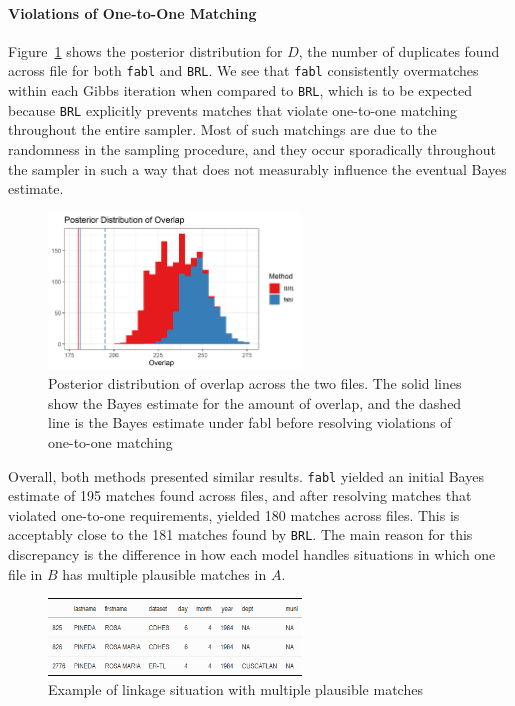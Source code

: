 \documentclass[12pt,letterpaper]{article}
\newcommand{\1}[1]{\mathbb{I}\!\left[#1\right]} %
\begin{document}
\paragraph{Violations of One-to-One Matching} Figure~\ref{fig:overlap-plot} shows the posterior distribution for \(D\), the number of
duplicates found across file for both \texttt{fabl} and \texttt{BRL}. We
see that \texttt{fabl} consistently overmatches within each Gibbs
iteration when compared to \texttt{BRL}, which is to be expected because
\texttt{BRL} explicitly prevents matches that violate one-to-one
matching throughout the entire sampler. Most of such matchings are due
to the randomness in the sampling procedure, and they occur sporadically
throughout the sampler in such a way that does not measurably influence
the eventual Bayes estimate.

\begin{figure}[t]
	
	{\centering \includegraphics[width=0.6\textwidth]{../notes/figures/el_salvador/overlap_distribution_smallP_bayes} 
		
	}
	
	\caption{Posterior distribution of overlap across the two files. The solid lines show the Bayes estimate for the amount of overlap, and the dashed line is the Bayes estimate under fabl before resolving violations of one-to-one matching}\label{fig:overlap-plot}
\end{figure}

Overall, both methods presented similar results. \texttt{fabl} yielded
an initial Bayes estimate of 195 matches found across files, and after
resolving matches that violated one-to-one requirements, yielded 180
matches across files. This is acceptably close to the 181 matches found
by \texttt{BRL}. The main reason for this discrepancy is the difference
in how each model handles situations in which one file in \(B\) has
multiple plausible matches in \(A\).

\begin{figure}[t]
	
	{\centering \includegraphics[width=0.6\textwidth]{../notes/figures/el_salvador/rosa_records} 
		
	}
	
	\caption{Example of linkage situation with multiple plausible matches}\label{fig:rosa-maria}
\end{figure}
\end{document}
